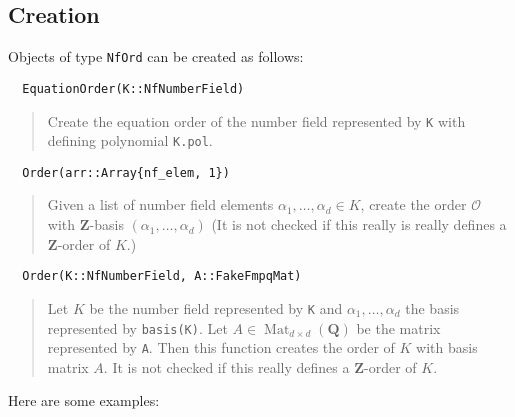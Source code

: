 \documentclass[a4paper,10pt]{article}
\newcommand{\Z}{\mathbf{Z}}
\newcommand{\Q}{\mathbf{Q}}
\newcommand{\code}{\lstinline}
\newcommand{\desc}[1]{\vspace{-3mm}\begin{quote}#1\end{quote}}
\newcommand{\Mat}{\operatorname{Mat}}
\begin{document}
\subsection{Creation}

Objects of type \code{NfOrd} can be created as follows:

\begin{lstlisting}
  EquationOrder(K::NfNumberField)
\end{lstlisting}

\desc{Create the equation order of the number field represented by \code{K} with defining polynomial \code{K.pol}.}

\begin{lstlisting}
  Order(arr::Array{nf_elem, 1})
\end{lstlisting}
  
\desc{Given a list of number field elements $\alpha_1,\dotsc, \alpha_d \in K$, create the order $\mathcal O$ with $\Z$-basis $(\alpha_1,\dotsc,\alpha_d)$ (It is not checked if this really is really defines a $\Z$-order of $K$.)}

\begin{lstlisting}
  Order(K::NfNumberField, A::FakeFmpqMat)
\end{lstlisting}

\desc{Let $K$ be the number field represented by \code{K} and $\alpha_1,\dotsc,\alpha_d$ the basis represented by \code{basis(K)}.
Let $A \in \Mat_{d \times d}(\Q)$ be the matrix represented by \code{A}. Then this function creates the order of $K$ with basis matrix $A$. It is not checked if this really defines a $\Z$-order of $K$.}

Here are some examples:
\end{document}
